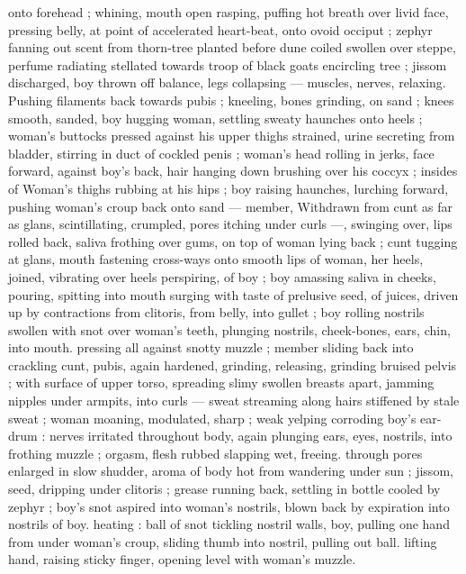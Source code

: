 onto forehead ; whining, mouth open rasping, puffing hot breath 
over livid face, pressing belly, at point of accelerated heart-beat, 
onto ovoid occiput ; zephyr fanning out scent from thorn-tree planted 
before dune coiled swollen over steppe, perfume radiating stellated 
towards troop of black goats encircling tree ; jissom discharged, boy 
thrown off balance, legs collapsing --- muscles, nerves, relaxing. 
Pushing filaments back towards pubis ; kneeling, bones grinding, on 
sand ; knees smooth, sanded, boy hugging woman, settling sweaty 
haunches onto heels ; woman's buttocks pressed against his upper 
thighs strained, urine secreting from bladder, stirring in duct of 
cockled penis ; woman's head rolling in jerks, face forward, against 
boy's back, hair hanging down brushing over his coccyx ; insides of 
Woman's thighs rubbing at his hips ; boy raising haunches, lurching 
forward, pushing woman's croup back onto sand --- member, 
Withdrawn from cunt as far as glans, scintillating, crumpled, pores 
itching under curls ---, swinging over, lips rolled back, saliva frothing 
over gums, on top of woman lying back ; cunt tugging at glans, 
mouth fastening cross-ways onto smooth lips of woman, her heels, 
joined, vibrating over heels perspiring, of boy ; boy amassing saliva 
in cheeks, pouring, spitting into mouth surging with taste of 
prelusive seed, of juices, driven up by contractions from clitoris, from 
belly, into gullet ; boy rolling nostrils swollen with snot over woman's 
teeth, plunging nostrils, cheek-bones, ears, chin, into mouth. 
pressing all against snotty muzzle ; member sliding back into 
crackling cunt, pubis, again hardened, grinding, releasing, grinding 
bruised pelvis ; with surface of upper torso, spreading slimy swollen 
breasts apart, jamming nipples under armpits, into curls --- sweat 
streaming along hairs stiffened by stale sweat ; woman moaning, 
modulated, sharp ; weak yelping corroding boy's ear-drum : nerves 
irritated throughout body, again plunging ears, eyes, nostrils, into 
frothing muzzle ; orgasm, flesh rubbed slapping wet, freeing. 
through pores enlarged in slow shudder, aroma of body hot from 
wandering under sun ; jissom, seed, dripping under clitoris ; grease 
running back, settling in bottle cooled by zephyr ; boy's snot aspired 
into woman's nostrils, blown back by expiration into nostrils of boy. 
heating : ball of snot tickling nostril walls, boy, pulling one hand from 
under woman's croup, sliding thumb into nostril, pulling out ball. 
lifting hand, raising sticky finger, opening level with woman's muzzle. 
